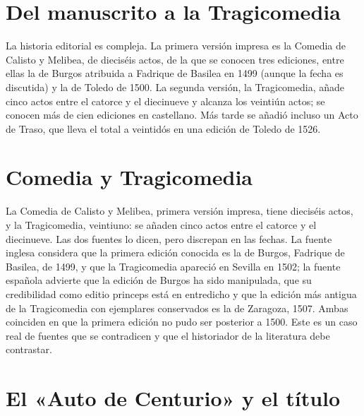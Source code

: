 \documentclass{book}
\begin{document}

\section{Del manuscrito a la Tragicomedia}

La historia editorial es compleja. La primera versión impresa es la Comedia de Calisto y Melibea, de dieciséis actos, de la que se conocen tres ediciones, entre ellas la de Burgos atribuida a Fadrique de Basilea en 1499 (aunque la fecha es discutida) y la de Toledo de 1500. La segunda versión, la Tragicomedia, añade cinco actos entre el catorce y el diecinueve y alcanza los veintiún actos; se conocen más de cien ediciones en castellano. Más tarde se añadió incluso un Acto de Traso, que lleva el total a veintidós en una edición de Toledo de 1526.


\section{Comedia y Tragicomedia}

La Comedia de Calisto y Melibea, primera versión impresa, tiene dieciséis actos, y la Tragicomedia, veintiuno: se añaden cinco actos entre el catorce y el diecinueve. Las dos fuentes lo dicen, pero discrepan en las fechas. La fuente inglesa considera que la primera edición conocida es la de Burgos, Fadrique de Basilea, de 1499, y que la Tragicomedia apareció en Sevilla en 1502; la fuente española advierte que la edición de Burgos ha sido manipulada, que su credibilidad como editio princeps está en entredicho y que la edición más antigua de la Tragicomedia con ejemplares conservados es la de Zaragoza, 1507. Ambas coinciden en que la primera edición no pudo ser posterior a 1500. Este es un caso real de fuentes que se contradicen y que el historiador de la literatura debe contrastar.


\section{El «Auto de Centurio» y el título}
\end{document}
